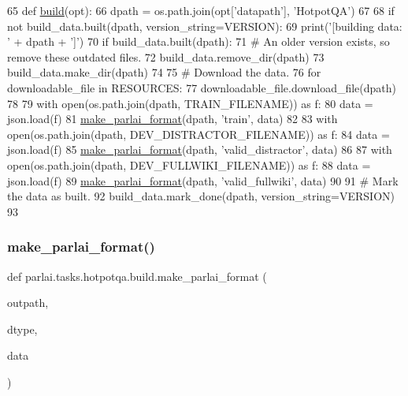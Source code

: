\begin{DoxyCode}
65 \textcolor{keyword}{def }\hyperlink{namespacedialog__babi__feedback_1_1build_a7a9d289f7493a5ded13c4b7f071b6184}{build}(opt):
66     dpath = os.path.join(opt[\textcolor{stringliteral}{'datapath'}], \textcolor{stringliteral}{'HotpotQA'})
67 
68     \textcolor{keywordflow}{if} \textcolor{keywordflow}{not} build\_data.built(dpath, version\_string=VERSION):
69         print(\textcolor{stringliteral}{'[building data: '} + dpath + \textcolor{stringliteral}{']'})
70         \textcolor{keywordflow}{if} build\_data.built(dpath):
71             \textcolor{comment}{# An older version exists, so remove these outdated files.}
72             build\_data.remove\_dir(dpath)
73         build\_data.make\_dir(dpath)
74 
75         \textcolor{comment}{# Download the data.}
76         \textcolor{keywordflow}{for} downloadable\_file \textcolor{keywordflow}{in} RESOURCES:
77             downloadable\_file.download\_file(dpath)
78 
79         with open(os.path.join(dpath, TRAIN\_FILENAME)) \textcolor{keyword}{as} f:
80             data = json.load(f)
81             \hyperlink{namespaceparlai_1_1tasks_1_1quac_1_1build_a08c212462b5c58cde91192d35f24f0cc}{make\_parlai\_format}(dpath, \textcolor{stringliteral}{'train'}, data)
82 
83         with open(os.path.join(dpath, DEV\_DISTRACTOR\_FILENAME)) \textcolor{keyword}{as} f:
84             data = json.load(f)
85             \hyperlink{namespaceparlai_1_1tasks_1_1quac_1_1build_a08c212462b5c58cde91192d35f24f0cc}{make\_parlai\_format}(dpath, \textcolor{stringliteral}{'valid\_distractor'}, data)
86 
87         with open(os.path.join(dpath, DEV\_FULLWIKI\_FILENAME)) \textcolor{keyword}{as} f:
88             data = json.load(f)
89             \hyperlink{namespaceparlai_1_1tasks_1_1quac_1_1build_a08c212462b5c58cde91192d35f24f0cc}{make\_parlai\_format}(dpath, \textcolor{stringliteral}{'valid\_fullwiki'}, data)
90 
91         \textcolor{comment}{# Mark the data as built.}
92         build\_data.mark\_done(dpath, version\_string=VERSION)
93 \end{DoxyCode}
\mbox{\label{namespaceparlai_1_1tasks_1_1hotpotqa_1_1build_a11cd6bdcce0c267fa7bebb496d930b44}} 
\subsubsection{\texorpdfstring{make\+\_\+parlai\+\_\+format()}{make\_parlai\_format()}}
{\footnotesize\ttfamily def parlai.\+tasks.\+hotpotqa.\+build.\+make\+\_\+parlai\+\_\+format (\begin{DoxyParamCaption}\item[{}]{outpath,  }\item[{}]{dtype,  }\item[{}]{data }\end{DoxyParamCaption})}




